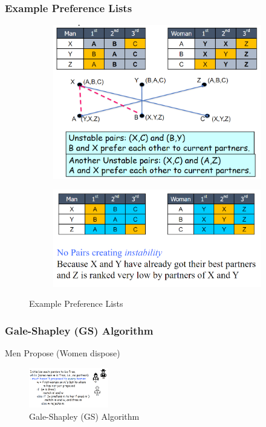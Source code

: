 \subsubsection{Example Preference Lists}
\begin{figure}[H]
    \centering
    \begin{subfigure}{0.309\textwidth}
        \centering
        \includegraphics[width=\textwidth]{pic/DAA10/Example Preference Lists1}
    \end{subfigure}
    \begin{subfigure}{0.309\textwidth}
        \centering
        \includegraphics[width=\textwidth]{pic/DAA10/Example Preference Lists2}
    \end{subfigure}
    \caption{Example Preference Lists}
\end{figure}

\subsubsection{Gale-Shapley (GS) Algorithm}
Men Propose (Women dispose)
\begin{figure}[H]
    \centering
    \includegraphics[width=0.309\textwidth]{pic/DAA10/Gale-Shapley (GS) Algorithm}
    \caption{Gale-Shapley (GS) Algorithm}
\end{figure}

